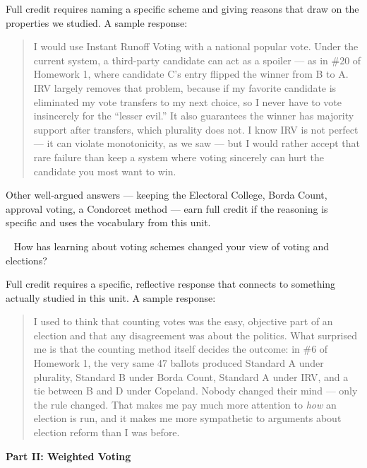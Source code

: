 \documentclass[11pt, oneside]{article}
\newcommand{\prt}[1]{\Needspace*{6\baselineskip}\vspace{1.1em}\noindent{\bf\large (#1)}\ }
\begin{document}
\begin{sol}
Full credit requires naming a specific scheme and giving reasons that draw on the
properties we studied. A sample response:

\begin{quote}
I would use Instant Runoff Voting with a national popular vote. Under the current
system, a third-party candidate can act as a spoiler --- as in \#20 of Homework 1,
where candidate C's entry flipped the winner from B to A. IRV largely removes that
problem, because if my favorite candidate is eliminated my vote transfers to my next
choice, so I never have to vote insincerely for the ``lesser evil.'' It also guarantees
the winner has majority support after transfers, which plurality does not. I know IRV
is not perfect --- it can violate monotonicity, as we saw --- but I would rather accept
that rare failure than keep a system where voting sincerely can hurt the candidate you
most want to win.
\end{quote}

Other well-argued answers --- keeping the Electoral College, Borda Count, approval
voting, a Condorcet method --- earn full credit if the reasoning is specific and uses
the vocabulary from this unit.
\end{sol}

\prt{3} How has learning about voting schemes changed your view of voting and elections?

\begin{sol}
Full credit requires a specific, reflective response that connects to something actually
studied in this unit. A sample response:

\begin{quote}
I used to think that counting votes was the easy, objective part of an election and
that any disagreement was about the politics. What surprised me is that the counting
method itself decides the outcome: in \#6 of Homework 1, the very same 47 ballots
produced Standard A under plurality, Standard B under Borda Count, Standard A under
IRV, and a tie between B and D under Copeland. Nobody changed their mind --- only the
rule changed. That makes me pay much more attention to \emph{how} an election is run,
and it makes me more sympathetic to arguments about election reform than I was before.
\end{quote}
\end{sol}

\clearpage
\begin{center}
{\Large\bf Part II: Weighted Voting}
\end{center}
\end{document}
